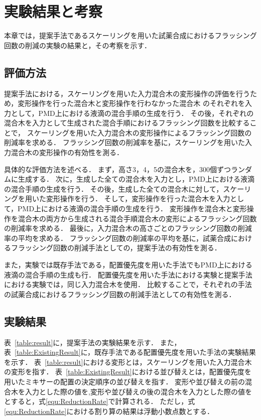 \chapter{実験結果と考察}
本章では，提案手法であるスケーリングを用いた試薬合成におけるフラッシング回数の削減の実験の結果と，その考察を示す．

\section{評価方法}
提案手法における，スケーリングを用いた入力混合木の変形操作の評価を行うため，変形操作を行った混合木と変形操作を行わなかった混合木
のそれぞれを入力として，PMD上における液滴の混合手順の生成を行う．
その後，それぞれの混合木を入力として生成された混合手順におけるフラッシング回数を比較することで，
スケーリングを用いた入力混合木の変形操作によるフラッシング回数の削減率を求める．
フラッシング回数の削減率を基に，スケーリングを用いた入力混合木の変形操作の有効性を測る．

具体的な評価方法を述べる．
まず，高さ3，4，5の混合木を，300個ずつランダムに生成する．
次に，生成した全ての混合木を入力とし，PMD上における液滴の混合手順の生成を行う．
その後，生成した全ての混合木に対して，スケーリングを用いた変形操作を行う．
そして，変形操作を行った混合木を入力として，PMD上における液滴の混合手順の生成を行う．
変形操作を混合木と変形操作を混合木の両方から生成される混合手順混合木の変形によるフラッシング回数の削減率を求める．
最後に，入力混合木の高さごとのフラッシング回数の削減率の平均を求める．
フラッシング回数の削減率の平均を基に，試薬合成におけるフラッシング回数の削減手法としての，提案手法の有効性を測る．

また，実験では既存手法である，配置優先度を用いた手法でもPMD上における液滴の混合手順の生成も行．
配置優先度を用いた手法における実験と提案手法における実験では，同じ入力混合木を使用．
比較することで，それぞれの手法の試薬合成におけるフラッシング回数の削減手法としての有効性を測る．

\section{実験結果}
表~\ref{table:result}に，提案手法の実験結果を示す．
また，表~\ref{table:ExistingResult}に，既存手法である配置優先度を用いた手法の実験結果を示す．
表~\ref{table:result}における変形とは，スケーリングを用いた入力混合木の変形を指す．
表~\ref{table:ExistingResult}における並び替えとは，配置優先度を用いたミキサーの配置の決定順序の並び替えを指す．
変形や並び替えの前の混合木を入力とした際の値を,変形や並び替えの後の混合木を入力とした際の値をとすると，式\ref{equ:ReductionRate}で計算される．
ただし，式\ref{equ:ReductionRate}における割り算の結果は浮動小数点数とする．

